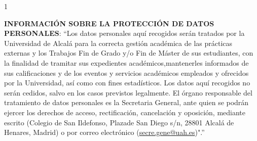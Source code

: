 %

\begin{spacing}{1}
  {\scriptsize \noindent \textbf{INFORMACIÓN SOBRE LA PROTECCIÓN DE DATOS PERSONALES}:
``Los datos personales aquí recogidos serán tratados por la Universidad de Alcalá para la correcta gestión académica de las prácticas externas y los Trabajos Fin de Grado y/o Fin de Máster de sus estudiantes, con la finalidad de tramitar sus expedientes académicos,mantenerles informados de sus calificaciones y de los eventos y servicios académicos empleados y ofrecidos por la Universidad, así como con fines estadísticos. Los datos aquí recogidos no serán cedidos, salvo en los casos previstos legalmente. El órgano responsable del tratamiento de datos personales es la Secretaria General, ante quien se podrán ejercer los derechos de acceso, rectificación, cancelación y oposición, mediante escrito (Colegio de San Ildefonso, Plazade San Diego s/n, 28801 Alcalá de Henares, Madrid) o por correo electrónico (\href{mailto:secre.gene@uah.es}{secre.gene@uah.es})".''\par}
\end{spacing}
